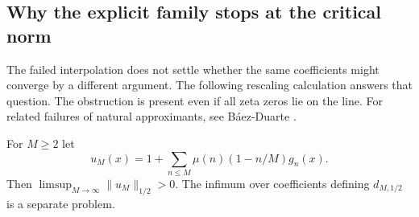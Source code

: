 \subsection{Why the explicit family stops at the critical norm}

The failed interpolation does not settle whether the same coefficients might converge by a different argument. The following rescaling calculation answers that question. The obstruction is present even if all zeta zeros lie on the line. For related failures of natural approximants, see B\'aez-Duarte \cite{bd-arith}.

\begin{theorem}\label{thm:riesz-failure}
For \(M\ge2\) let
\[
 u_M(x)=1+\sum_{n\le M}\mu(n)(1-n/M)g_n(x).
\]
Then \(\limsup_{M\to\infty}\|u_M\|_{1/2}>0\). The infimum over coefficients defining \(d_{M,1/2}\) is a separate problem.
\end{theorem}
